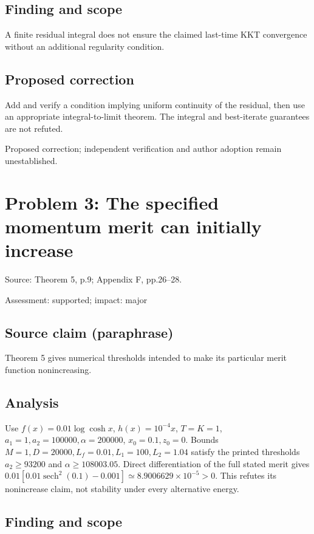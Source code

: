 \documentclass[11pt]{article}
\begin{document}
\subsection*{Finding and scope}

A finite residual integral does not ensure the claimed last-time KKT convergence without an additional regularity condition.

\subsection*{Proposed correction}

Add and verify a condition implying uniform continuity of the residual, then use an appropriate integral-to-limit theorem. The integral and best-iterate guarantees are not refuted.

Proposed correction; independent verification and author adoption remain unestablished.

\section*{Problem 3: The specified momentum merit can initially increase}

Source: Theorem 5, p.9; Appendix F, pp.26–28.

Assessment: supported; impact: major

\subsection*{Source claim (paraphrase)}

Theorem 5 gives numerical thresholds intended to make its particular merit function nonincreasing.

\subsection*{Analysis}

Use \(f(x)=0.01\log\cosh x\), \(h(x)=10^{-4}x\), \(T=K=1\), \(a_1=1,a_2=100000,\alpha=200000\), \(x_0=0.1,z_0=0\). Bounds \(M=1,D=20000,L_f=0.01,L_1=100,L_2=1.04\) satisfy the printed thresholds \(a_2\ge93200\) and \(\alpha\ge108003.05\). Direct differentiation of the full stated merit gives \(0.01[0.01\operatorname{sech}^2(0.1)-0.001]\simeq8.9006629\times10^{-5}>0\). This refutes its nonincrease claim, not stability under every alternative energy.

\subsection*{Finding and scope}
\end{document}

